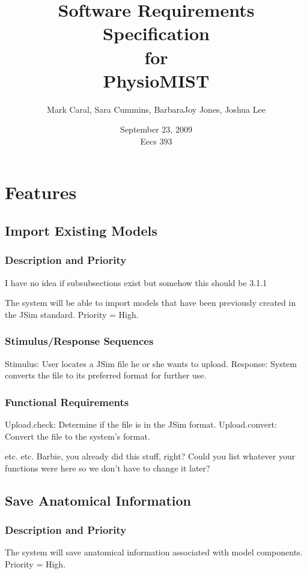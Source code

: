 \documentclass{article}
\title{Software Requirements Specification\\
\bigskip
{\large for}\\
\bigskip
PhysioMIST}
\author{Mark Caral, Sara Cummins, BarbaraJoy Jones, Joshua Lee}
\date{September 23, 2009\\{\sc Eecs} 393}
\begin{document}
\begin{titlepage}
\maketitle\thispagestyle{empty}
\end{titlepage}

\tableofcontents
\newpage

\section{Features}
\subsection{Import Existing Models}

\subsubsection{Description and Priority}
I have no idea if subsubsections exist but somehow this should be 3.1.1


The system will be able to import models that have been previously created in the JSim standard.  Priority = High.

\subsubsection{Stimulus/Response Sequences}

Stimulus: User locates a JSim file he or she wants to upload.
Response: System converts the file to its preferred format for further use.

\subsubsection{Functional Requirements}
Upload.check: Determine if the file is in the JSim format.
Upload.convert: Convert the file to the system's format.

etc. etc. Barbie, you already did this stuff, right?  Could you list whatever your functions were here so we don't have to change it later?


\subsection{Save Anatomical Information}
\subsubsection{Description and Priority}
The system will save anatomical information associated with model components.  Priority = High.
\end{document}
